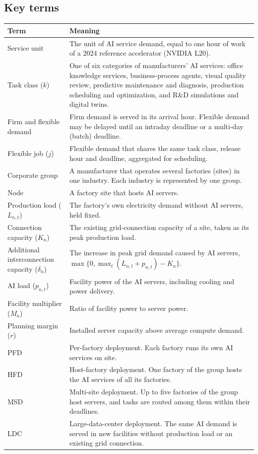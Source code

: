\documentclass[11pt]{article}
\begin{document}
\subsection*{Key terms}
\begin{table}[H]
\centering\small
\begin{tabular}{@{}L{0.27\textwidth}L{0.69\textwidth}@{}}
\toprule
Term & Meaning \\
\midrule
Service unit & The unit of AI service demand, equal to one hour of work of a 2024 reference accelerator (NVIDIA L20). \\
Task class ($k$) & One of six categories of manufacturers' AI services: office knowledge services, business-process agents, visual quality review, predictive maintenance and diagnosis, production scheduling and optimization, and R\&D simulations and digital twins. \\
Firm and flexible demand & Firm demand is served in its arrival hour. Flexible demand may be delayed until an intraday deadline or a multi-day (batch) deadline. \\
Flexible job ($j$) & Flexible demand that shares the same task class, release hour and deadline, aggregated for scheduling. \\
Corporate group & A manufacturer that operates several factories (sites) in one industry. Each industry is represented by one group. \\
Node & A factory site that hosts AI servers. \\
Production load ($L_{n,t}$) & The factory's own electricity demand without AI servers, held fixed. \\
Connection capacity ($K_n$) & The existing grid-connection capacity of a site, taken as its peak production load. \\
Additional interconnection capacity ($\delta_n$) & The increase in peak grid demand caused by AI servers, $\max\{0,\max_t(L_{n,t}+p_{n,t})-K_n\}$. \\
AI load ($p_{n,t}$) & Facility power of the AI servers, including cooling and power delivery. \\
Facility multiplier ($M_a$) & Ratio of facility power to server power. \\
Planning margin ($r$) & Installed server capacity above average compute demand. \\
PFD & Per-factory deployment. Each factory runs its own AI services on site. \\
HFD & Host-factory deployment. One factory of the group hosts the AI services of all its factories. \\
MSD & Multi-site deployment. Up to five factories of the group host servers, and tasks are routed among them within their deadlines. \\
LDC & Large-data-center deployment. The same AI demand is served in new facilities without production load or an existing grid connection. \\
\bottomrule
\end{tabular}
\end{table}
\end{document}

